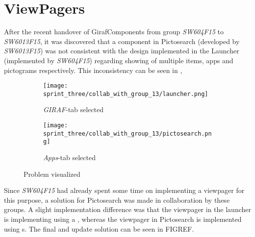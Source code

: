 
\section{ViewPagers} %
\label{sec:viewpagers}


After the recent handover of GirafComponents from group \emph{SW604F15} to \emph{SW6013F15}, it was discovered that a component in Pictosearch (developed by \emph{SW6013F15}) was not consistent with the design implemented in the Launcher (implemented by \emph{SW604F15}) regarding showing of multiple items, apps and pictograms respectively. This inconsistency can be seen in , 

\begin{figure}[!htbp]
    \centering

    \begin{subfigure}[t]{0.4\textwidth}
        \texttt{[image: sprint\_three/collab\_with\_group\_13/launcher.png]}
        \caption{\emph{GIRAF}-tab selected}
        \label{fig:collab_with_group_13_launhcer}
    \end{subfigure}
    \hspace{5em} 
    \begin{subfigure}[t]{0.4\textwidth}
        \texttt{[image: sprint\_three/collab\_with\_group\_13/pictosearch.png]}
        \caption{\emph{Apps}-tab selected}
        \label{fig:collab_with_group_13_pictosearch}
    \end{subfigure}
    
    \caption{Problem visualized}
    \label{fig:collab_with_group_13}
\end{figure}

Since \emph{SW604F15} had already spent some time on implementing a viewpager for this purpose, a solution for Pictosearch was made in collaboration by these groups. A slight implementation difference was that the viewpager in the launcher is implementing using a , whereas the viewpager in Pictosearch is implemented using s. The final and update solution can be seen in FIGREF.

